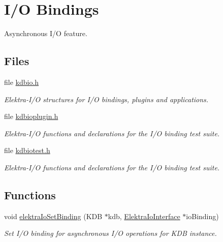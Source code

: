 \hypertarget{group__kdbio}{}\section{I/O Bindings}
\label{group__kdbio}


Asynchronous I/O feature.  


\subsection*{Files}
\begin{DoxyCompactItemize}
\item 
file \mbox{\hyperlink{kdbio_8h}{kdbio.\+h}}
\begin{DoxyCompactList}\small\item\em Elektra-\/\+I/O structures for I/O bindings, plugins and applications. \end{DoxyCompactList}\item 
file \mbox{\hyperlink{kdbioplugin_8h}{kdbioplugin.\+h}}
\begin{DoxyCompactList}\small\item\em Elektra-\/\+I/O functions and declarations for the I/O binding test suite. \end{DoxyCompactList}\item 
file \mbox{\hyperlink{kdbiotest_8h}{kdbiotest.\+h}}
\begin{DoxyCompactList}\small\item\em Elektra-\/\+I/O functions and declarations for the I/O binding test suite. \end{DoxyCompactList}\end{DoxyCompactItemize}
\subsection*{Functions}
\begin{DoxyCompactItemize}
\item 
void \mbox{\hyperlink{group__kdbio_ga187345483bdfbb404919c6797bc2db77}{elektra\+Io\+Set\+Binding}} (K\+DB $\ast$kdb, \mbox{\hyperlink{kdbio_8h_aabcd87b8c09d4d4c1033fc1baa417391}{Elektra\+Io\+Interface}} $\ast$io\+Binding)
\begin{DoxyCompactList}\small\item\em Set I/O binding for asynchronous I/O operations for K\+DB instance. \end{DoxyCompactList}\end{DoxyCompactItemize}


